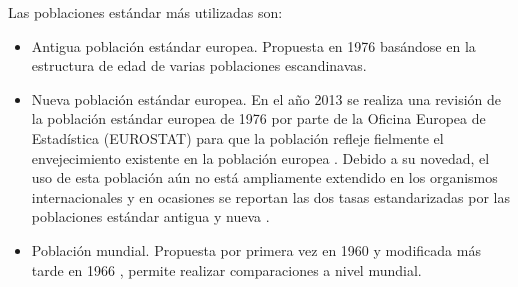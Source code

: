Las poblaciones estándar más utilizadas son:
\begin{itemize}
	
	
	\item Antigua población estándar europea. Propuesta en 1976 \cite{Waterhouse1976} basándose en la estructura de edad de varias poblaciones escandinavas.
	
	\item Nueva población estándar europea. En el año 2013 se realiza una revisión de la población estándar europea de 1976 por parte de la Oficina Europea de Estadística (EUROSTAT) para que la población refleje fielmente el envejecimiento existente en la población europea \cite{EUROSTAT2013}. Debido a su novedad, el uso de esta población aún no está ampliamente extendido en los organismos internacionales \cite{ECIS2} y en ocasiones se reportan las dos tasas estandarizadas por las poblaciones estándar antigua y nueva \cite{ECIS}.
	
	\item Población mundial. Propuesta por primera vez en 1960 \cite{SegiM.1960} y modificada más tarde en 1966 \cite{Doll1966}, permite realizar comparaciones a nivel mundial.
\end{itemize}

